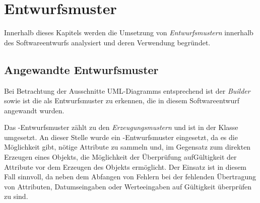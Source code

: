 \chapter{Entwurfsmuster}
\label{entwurfsmuster}
Innerhalb dieses Kapitels werden die Umsetzung von \textit{Entwurfsmustern} innerhalb des Softwareentwurfs analysiert und deren Verwendung begründet.


\section{Angewandte Entwurfsmuster}
Bei Betrachtung der Ausschnitte UML-Diagramms entsprechend  ist der \textit{Builder} sowie  ist die  als Entwurfsmuster zu erkennen, die in diesem Softwareentwurf angewandt wurden.



Das -Entwurfsmuster zählt zu den \textit{Erzeugungsmustern} und ist in der Klasse  umgesetzt.
An dieser Stelle wurde ein -Entwurfsmuster eingesetzt, da es die Möglichkeit gibt, nötige Attribute zu sammeln und, im Gegensatz zum direkten Erzeugen eines Objekts, die Möglichkeit der Überprüfung aufGültigkeit der Attribute vor dem Erzeugen des Objekts ermöglicht.
Der Einsatz ist in diesem Fall sinnvoll, da neben dem Abfangen von Fehlern bei der fehlenden Übertragung von Attributen, Datumseingaben oder Werteeingaben auf Gültigkeit überprüfen zu sind.

